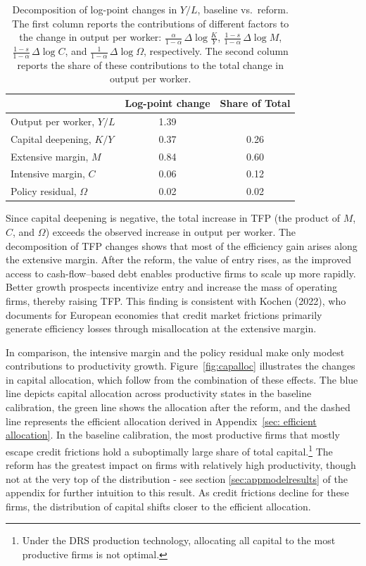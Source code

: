 \documentclass[12pt]{article}
\begin{document}
\begin{table}[H]
\centering
\begin{tabular}{lcc}
\toprule
 & Log-point change & Share of Total \\
\midrule
Output per worker, $Y/L$   & 1.39 &   \\
\midrule
Capital deepening, $K/Y$   & 0.37 & 0.26 \\
Extensive margin, $M$      & 0.84 & 0.60 \\
Intensive margin, $C$      & 0.06 & 0.12 \\
Policy residual, $\Omega$  & 0.02 & 0.02 \\
\bottomrule
\end{tabular}
\caption{\small Decomposition of log-point changes in $Y/L$, baseline vs.~reform. 
The first column reports the contributions of different factors to the change in output per worker: 
$\tfrac{\alpha}{1-\alpha}\,\Delta\log \tfrac{K}{Y}$, 
$\tfrac{1-s}{1-\alpha}\,\Delta\log M$, 
$\tfrac{1-s}{1-\alpha}\,\Delta\log C$, 
and $\tfrac{1}{1-\alpha}\,\Delta\log \Omega$, respectively. The second column reports the share of these contributions to the total change in output per worker.}
\label{tab:decomposition}
\end{table}

Since capital deepening is negative, the total increase in TFP (the product of $M$, $C$, and $\Omega$) exceeds the observed increase in output per worker. The decomposition of TFP changes shows that most of the efficiency gain arises along the extensive margin. After the reform, the value of entry rises, as the improved access to cash-flow–based debt enables productive firms to scale up more rapidly. Better growth prospects incentivize entry and increase the mass of operating firms, thereby raising TFP. This finding is consistent with Kochen (2022), who documents for European economies that credit market frictions primarily generate efficiency losses through misallocation at the extensive margin. 

In comparison, the intensive margin and the policy residual make only modest contributions to productivity growth. Figure~\ref{fig:capalloc} illustrates the changes in capital allocation, which follow from the combination of these effects. The blue line depicts capital allocation across productivity states in the baseline calibration, the green line shows the allocation after the reform, and the dashed line represents the efficient allocation derived in Appendix~\ref{sec: efficient allocation}. In the baseline calibration, the most productive firms that mostly escape credit frictions hold a suboptimally large share of total capital.\footnote{Under the DRS production technology, allocating all capital to the most productive firms is not optimal.} The reform has the greatest impact on firms with relatively high productivity, though not at the very top of the distribution - see section \ref{sec:appmodelresults} of the appendix for further intuition to this result. As credit frictions decline for these firms, the distribution of capital shifts closer to the efficient allocation.
\end{document}
